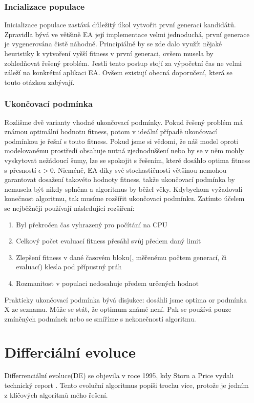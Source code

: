 \subsubsection{Incializace populace}
Inicializace populace zastává důležitý úkol vytvořit první generaci kandidátů. Zpravidla bývá ve většině EA její implementace velmi jednoduchá, první generace je vygenerována čistě náhodně. Principiálně by se zde dalo využít nějaké heuristiky k vytvoření vyšší fitness v první generaci, ovšem musela by zohledňovat řešený problém. Jestli tento postup stojí za výpočetní čas ne velmi záleží na konkrétní aplikaci EA. Ovšem existují obecná doporučení, která se touto otázkou zabývají. 
\subsubsection{Ukončovací podmínka}
Rozlišme dvě varianty vhodné ukončovací podmínky. Pokud řešený problém má známou optimální hodnotu fitness, potom v ideální případě ukončovací podmínkou je řešní s touto fitness. Pokud jsme si vědomi, že náš model oproti modelovanému prostředí obsahuje nutná zjednoduššení nebo by se v něm mohly vyskytovat nežádoucí šumy, lze se spokojit s řešením, které dosáhlo optima fitness s přesností $\epsilon > 0$. Nicméně, EA díky své stochastičnosti většinou nemohou garantovat dosažení takovéto hodnoty fitness, takže ukončovací podmínka by nemusela být nikdy splněna a algoritmus by běžel věky. Kdybychom vyžadovali konečnost algoritmu, tak musíme rozšířit ukončovací podmínku. Zatímto účelem se nejběžněji používají následující rozšíření: \par
\begin{enumerate}
\item Byl překročen čas vyhrazený pro počítání na CPU
\item Celkový počet evaluací fitness přesáhl svůj předem daný limit 
\item Zlepšení fitness v dané časovém bloku(, měřenému počtem generací, či evaluací) klesla pod přípustný práh
\item Rozmanitost v populaci nedosahuje předem určených hodnot
\end{enumerate}
Prakticky ukončovací podmínka bývá disjukce: dosáhli jsme optima or podmínka X ze seznamu. Může se stát, že optimum známé není. Pak se používá pouze zmíněných podmínek nebo se smíříme s nekonečností algoritmu. 

\section{Differciální evoluce}
Differrenciální evoluce(DE) se objevila v roce 1995, kdy Storn a Price vydali technický report \cite{Storn1997}. Tento evoluční algoritmus popíši trochu více, protože je jedním z klíčových algoritmů mého řešení. 
